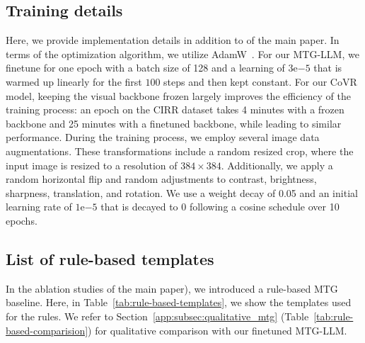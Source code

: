 \subsection{Training details}
\label{app:subsec:training}
Here, we provide implementation details
in addition to
\if{} \fi
of the main paper. 
In terms of the optimization algorithm, 
we utilize AdamW~\cite{loshchilov2017decoupled}.
For our MTG-LLM, we finetune for one epoch with a batch size of 128 and a learning of $3\mathrm{e}{-5}$ that is warmed up linearly for the first $100$ steps and then kept constant.
For our CoVR model, keeping the visual backbone frozen largely improves the efficiency of the training process:
an epoch on the CIRR dataset takes 4 minutes with a frozen backbone and 25 minutes with a finetuned backbone, while leading to similar performance.
During the training process, 
we employ several image data augmentations. 
These transformations include a random resized crop, 
where the input image is resized to a resolution of $384 \times 384$. 
Additionally, we apply a random horizontal flip and random adjustments to contrast, brightness, sharpness, translation, and rotation.
We use a weight decay of 0.05 and an initial learning rate of $1\mathrm{e}{-5}$ that is decayed to 0 following a cosine schedule over 10 epochs.

\subsection{List of rule-based templates}
\label{app:subsec:rule-based}

In the ablation studies 
\if{} \fi
of the main paper),
we introduced a rule-based MTG baseline.
Here, in Table~\ref{tab:rule-based-templates}, we show the templates used for the rules.
We refer to Section~\ref{app:subsec:qualitative_mtg} (Table~\ref{tab:rule-based-comparision})
for qualitative comparison with our finetuned MTG-LLM.

